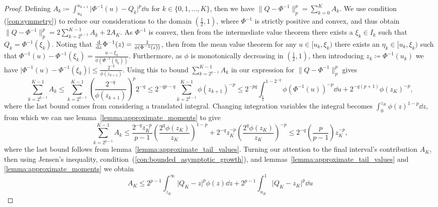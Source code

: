 \documentclass[manuscript,review]{acmart}
\begin{document}
\begin{proof} Defining $ A_k \coloneqq \int_{u_k}^{u_{k+1}} \lvert\Phi^{-1}(u) - Q_k\rvert^p \dd{u} $ for $ k \in \{0,1, \ldots, K\} $, then we have $ \lVert Q - \Phi^{-1} \rVert_p^p = \sum_{k=0}^{K} A_k $.  We use condition (\ref{con:symmetry}) to reduce our considerations to the domain $ (\tfrac{1}{2}, 1) $, where $ \Phi^{-1} $ is strictly positive and convex, and thus obtain $ \lVert Q - \Phi^{-1} \rVert_p^p = 2 \sum_{k=2^{q-1}}^{K-1} A_k + 2 A_K $. As $ \Phi^{-1} $ is convex, then from the intermediate value theorem there exists a $ \xi_k \in I_k $ such that $ Q_k = \Phi^{-1}(\xi_k) $. Noting that $ \dv{z} \Phi^{-1}(z) = \tfrac{1}{\phi(\Phi^{-1}(z))} $, then from the mean value theorem  for any $ u \in [u_k, \xi_k)$ there exists an $ \eta_k \in [u_k, \xi_k)$ such that $ \Phi^{-1}(u) - \Phi^{-1}(\xi_k) = \tfrac{u - \xi_k}{\phi(\Phi^{-1}(\eta_k))} $. Furthermore, as $ \phi $ is monotonically decreasing in $ (\tfrac{1}{2}, 1) $, then introducing $ z_k \coloneqq \Phi^{-1}(u_k) $ we have $ \lvert \Phi^{-1}(u) - \Phi^{-1}(\xi_k)\rvert \leq \tfrac{2^{-q}}{\phi(z_{k+1})}$.  Using this to bound $ \sum_{k=2^{q-1}}^{K-1} A_k $ in our expression for $ \lVert Q - \Phi^{-1}\rVert_p^p $ gives
\begin{equation*}
\sum_{k=2^{q-1}}^{K-1} A_k 
\leq \sum_{k=2^{q-1}}^{K - 1} \left(\frac{2^{-q}}{\phi(z_{k+1})}\right)^p 2^{-q} 
\leq 2^{-qp - q} \sum_{k=2^{q-1}}^{K - 1}  \phi(z_{k+1})^{-p} 
\leq 2^{-pq} \int_{\frac{1}{2}}^{1 - 2^{-q}} \phi(\Phi^{-1}(u))^{-p} \dd{u} + 2^{-q(p+1)}\phi(z_K)^{-p},
\end{equation*}
where the last bound comes from considering a translated integral. Changing integration variables the integral becomes $  \int_{0}^{z_K} \phi(z)^{1-p} \dd{z} $, from which we can use lemma~\ref{lemma:approximate_moments} to give 
\begin{equation*}
\sum_{k=2^{q-1}}^{K-1} A_k 
\leq \frac{2^{-q} z_K^{-p}}{p-1} \left(\frac{2^q\phi(z_K)}{z_K}\right)^{1-p} + 2^{-q}z_K^{-p} \left(\frac{2^q\phi(z_K)}{z_K}\right)^{-p}
\leq 2^{-q} \left(\frac{p}{p-1}\right) z_K^{-p},
\end{equation*}
where the last bound follows from lemma~\ref{lemma:approximate_tail_values}. Turning our attention to the final interval's contribution $ A_K $, then using Jensen's inequality, condition~(\ref{con:bounded_asymptotic_growth}), and lemmas~\ref{lemma:approximate_tail_values} and \ref{lemma:approximate_moments} we obtain
\begin{equation*}
A_K 
\leq 2^{p-1} \int_{z_K}^{\infty} \lvert Q_K - z\rvert^p \phi(z) \dd{z} +  2^{p-1} \int_{u_K}^{1} \lvert Q_K - z_K \rvert^p \dd{u} 

\end{equation*}
\end{proof}
\end{document}

